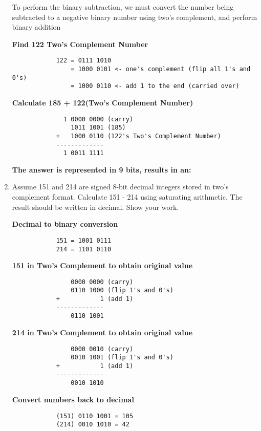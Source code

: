 \documentclass{article}
\begin{document}
\begin{enumerate}
        To perform the binary subtraction, we must convert the number being subtracted to a negative binary number using two's complement, and perform binary addition

        \textbf{Find 122 Two's Complement Number}
        \begin{verbatim}
            122 = 0111 1010
                = 1000 0101 <- one's complement (flip all 1's and 0's)
                = 1000 0110 <- add 1 to the end (carried over)
        \end{verbatim}

        \textbf{Calculate 185 + 122(Two's Complement Number)}
        \begin{verbatim}
              1 0000 0000 (carry)
                1011 1001 (185)
            +   1000 0110 (122's Two's Complement Number)
            -------------
              1 0011 1111
        \end{verbatim}

        \textbf{The answer is represented in 9 bits, results in an: }

        \item Assume 151 and 214 are signed 8-bit decimal integers stored in two's complement format. Calculate 151 - 214 using saturating arithmetic. The result should be written in decimal. Show your work.
        
        \textbf{Decimal to binary conversion}
        \begin{verbatim}
            151 = 1001 0111
            214 = 1101 0110
        \end{verbatim}

        \textbf{151 in Two's Complement to obtain original value}
        \begin{verbatim}
                0000 0000 (carry)
                0110 1000 (flip 1's and 0's)
            +           1 (add 1)
            -------------
                0110 1001
        \end{verbatim}

        \textbf{214 in Two's Complement to obtain original value}
        \begin{verbatim}
                0000 0010 (carry)
                0010 1001 (flip 1's and 0's)
            +           1 (add 1)
            -------------
                0010 1010
        \end{verbatim}

        \textbf{Convert numbers back to decimal}
        \begin{verbatim}
            (151) 0110 1001 = 105
            (214) 0010 1010 = 42
        \end{verbatim}


\end{enumerate}
\end{document}
